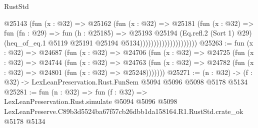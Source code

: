 \begin{lexlean}{RustStd}
\begin{coremodule}
                                    @25143
                                      (fun (x : @32) =>
                                      @25162
                                        (fun (x : @32) =>
                                        @25181
                                          (fun (x : @32) =>
                                          fun (fn : @29) =>
                                          fun (h : @25185) =>
                                          @25193
                                            @25194
                                            (Eq.refl.{2} (Sort 1) @29)
                                            (heq_of_eq.{1}
                                              @5119
                                              @25191
                                              @25194
                                              @5134)))))))))))))))))))))
@25263 := fun (x : @32) =>
  @24687
    (fun (x : @32) =>
    @24706
      (fun (x : @32) =>
      @24725
        (fun (x : @32) =>
        @24744
          (fun (x : @32) =>
          @24763 (fun (x : @32) => @24782 (fun (x : @32) => @24801 (fun (x : @32) => @25248)))))))
@25271 := (n : @32) -> (f : @32) -> LexLeanPreservation.Rust.FunSem @5094 @5096 @5098 @5178 @5134
@25281 := fun (n : @32) =>
  fun (f : @32) =>
  LexLeanPreservation.Rust.simulate
    @5094
    @5096
    @5098
    LexLeanPreserve.C89b3d5524ba67f57cb26dbb1da158164.R1.RustStd.crate_ok
    @5178
    @5134
\end{coremodule}
\end{lexlean}
